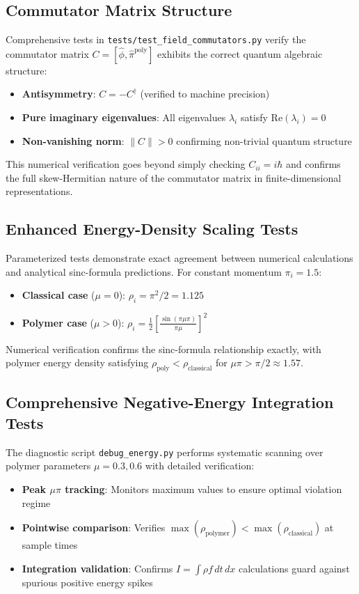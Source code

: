 \documentclass[12pt]{article}
\begin{document}
\subsection{Commutator Matrix Structure}

Comprehensive tests in \texttt{tests/test\_field\_commutators.py} verify the commutator matrix $C = [\hat{\phi}, \hat{\pi}^{\text{poly}}]$ exhibits the correct quantum algebraic structure:
\begin{itemize}
\item \textbf{Antisymmetry}: $C = -C^{\dagger}$ (verified to machine precision)
\item \textbf{Pure imaginary eigenvalues}: All eigenvalues $\lambda_i$ satisfy $\text{Re}(\lambda_i) = 0$
\item \textbf{Non-vanishing norm}: $\|C\| > 0$ confirming non-trivial quantum structure
\end{itemize}

This numerical verification goes beyond simply checking $C_{ii} = i\hbar$ and confirms the full skew-Hermitian nature of the commutator matrix in finite-dimensional representations.

\subsection{Enhanced Energy-Density Scaling Tests}

Parameterized tests demonstrate exact agreement between numerical calculations and analytical sinc-formula predictions. For constant momentum $\pi_i = 1.5$:
\begin{itemize}
\item \textbf{Classical case} ($\mu = 0$): $\rho_i = \pi^2/2 = 1.125$
\item \textbf{Polymer case} ($\mu > 0$): $\rho_i = \frac{1}{2}\left[\frac{\sin(\pi\mu\pi)}{\pi\mu}\right]^2$
\end{itemize}

Numerical verification confirms the sinc-formula relationship exactly, with polymer energy density satisfying $\rho_{\text{poly}} < \rho_{\text{classical}}$ for $\mu\pi > \pi/2 \approx 1.57$.

\subsection{Comprehensive Negative-Energy Integration Tests}

The diagnostic script \texttt{debug\_energy.py} performs systematic scanning over polymer parameters $\mu = 0.3, 0.6$ with detailed verification:
\begin{itemize}
\item \textbf{Peak $\mu\pi$ tracking}: Monitors maximum values to ensure optimal violation regime
\item \textbf{Pointwise comparison}: Verifies $\max(\rho_{\text{polymer}}) < \max(\rho_{\text{classical}})$ at sample times
\item \textbf{Integration validation}: Confirms $I = \int\rho f \, dt \, dx$ calculations guard against spurious positive energy spikes
\end{itemize}
\end{document}
